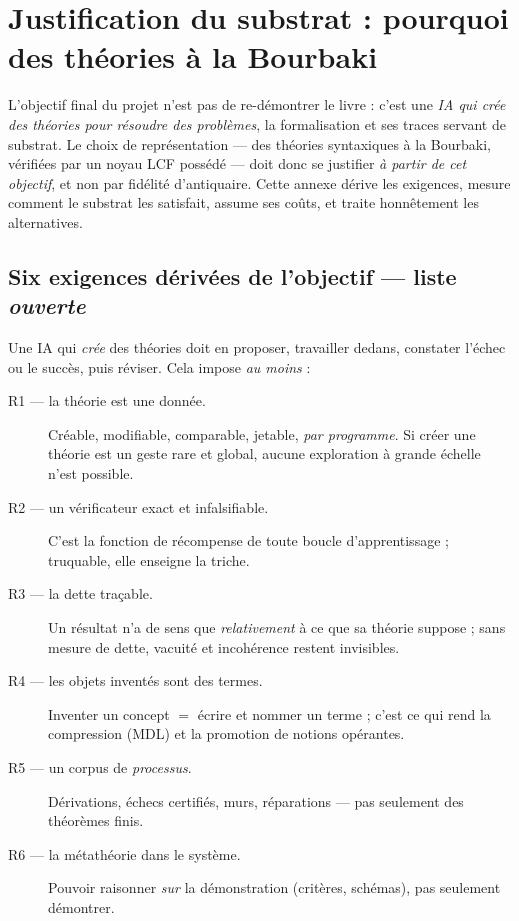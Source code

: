 \section{Justification du substrat : pourquoi des théories à la Bourbaki}

L'objectif final du projet n'est pas de re-démontrer le livre : c'est une
\emph{IA qui crée des théories pour résoudre des problèmes}, la formalisation
et ses traces servant de substrat. Le choix de représentation --- des théories
syntaxiques à la Bourbaki, vérifiées par un noyau LCF possédé --- doit donc se
justifier \emph{à partir de cet objectif}, et non par fidélité d'antiquaire.
Cette annexe dérive les exigences, mesure comment le substrat les satisfait,
assume ses coûts, et traite honnêtement les alternatives.

\subsection{Six exigences dérivées de l'objectif --- liste \emph{ouverte}}

Une IA qui \emph{crée} des théories doit en proposer, travailler dedans,
constater l'échec ou le succès, puis réviser. Cela impose \emph{au moins} :

\begin{description}
\item[R1 --- la théorie est une donnée.] Créable, modifiable, comparable,
  jetable, \emph{par programme}. Si créer une théorie est un geste rare et
  global, aucune exploration à grande échelle n'est possible.
\item[R2 --- un vérificateur exact et infalsifiable.] C'est la fonction de
  récompense de toute boucle d'apprentissage ; truquable, elle enseigne la
  triche.
\item[R3 --- la dette traçable.] Un résultat n'a de sens que \emph{relativement}
  à ce que sa théorie suppose ; sans mesure de dette, vacuité et incohérence
  restent invisibles.
\item[R4 --- les objets inventés sont des termes.] Inventer un concept $=$
  écrire et nommer un terme ; c'est ce qui rend la compression (MDL) et la
  promotion de notions opérantes.
\item[R5 --- un corpus de \emph{processus}.] Dérivations, échecs certifiés,
  murs, réparations --- pas seulement des théorèmes finis.
\item[R6 --- la métathéorie dans le système.] Pouvoir raisonner \emph{sur} la
  démonstration (critères, schémas), pas seulement démontrer.
\end{description}

